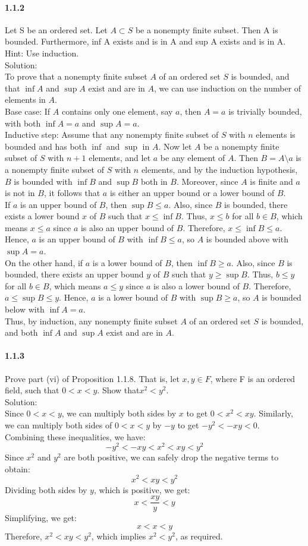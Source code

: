 \documentclass{article}
\begin{document}
\paragraph{1.1.2}
Let S be an ordered set. Let $A \subset S$ be a nonempty finite subset. Then A is bounded.
Furthermore, inf A exists and is in A and sup A exists and is in A. Hint: Use induction.\\
Solution:\\
To prove that a nonempty finite subset $A$ of an ordered set $S$ is bounded, and that $\inf A$ and $\sup A$ exist and are in $A$, we can use induction on the number of elements in $A$.\\
Base case: If $A$ contains only one element, say $a$, then $A={a}$ is trivially bounded, with both $\inf A=a$ and $\sup A=a$.\\
Inductive step: Assume that any nonempty finite subset of $S$ with $n$ elements is bounded and has both $\inf$ and $\sup$ in $A$. Now let $A$ be a nonempty finite subset of $S$ with $n+1$ elements, and let $a$ be any element of $A$. Then $B=A\setminus{a}$ is a nonempty finite subset of $S$ with $n$ elements, and by the induction hypothesis, $B$ is bounded with $\inf B$ and $\sup B$ both in $B$. Moreover, since $A$ is finite and $a$ is not in $B$, it follows that $a$ is either an upper bound or a lower bound of $B$.\\
If $a$ is an upper bound of $B$, then $\sup B\leq a$. Also, since $B$ is bounded, there exists a lower bound $x$ of $B$ such that $x\leq\inf B$. Thus, $x\leq b$ for all $b\in B$, which means $x\leq a$ since $a$ is also an upper bound of $B$. Therefore, $x\leq\inf B\leq a$. Hence, $a$ is an upper bound of $B$ with $\inf B\leq a$, so $A$ is bounded above with $\sup A=a$.\\
On the other hand, if $a$ is a lower bound of $B$, then $\inf B\geq a$. Also, since $B$ is bounded, there exists an upper bound $y$ of $B$ such that $y\geq\sup B$. Thus, $b\leq y$ for all $b\in B$, which means $a\leq y$ since $a$ is also a lower bound of $B$. Therefore, $a\leq\sup B\leq y$. Hence, $a$ is a lower bound of $B$ with $\sup B\geq a$, so $A$ is bounded below with $\inf A=a$.\\
Thus, by induction, any nonempty finite subset $A$ of an ordered set $S$ is bounded, and both $\inf A$ and $\sup A$ exist and are in $A$.
\paragraph{1.1.3}
Prove part (vi) of Proposition 1.1.8. That is, let $x, y \in F$, where F is an ordered field, such
that $0 < x < y$. Show that$ x^2 < y^2$.\\
Solution:\\
Since $0<x<y$, we can multiply both sides by $x$ to get $0<x^2<xy$.
Similarly, we can multiply both sides of $0<x<y$ by $-y$ to get $-y^2<-xy<0$.\\
Combining these inequalities, we have:
$$-y^2 < -xy < x^2 < xy < y^2$$
Since $x^2$ and $y^2$ are both positive, we can safely drop the negative terms to obtain:
$$x^2 < xy < y^2$$
Dividing both sides by $y$, which is positive, we get:
$$x < \frac{xy}{y} < y$$
Simplifying, we get:
$$x < x < y$$
Therefore, $x^2 < xy < y^2$, which implies $x^2 < y^2$, as required.
\end{document}
